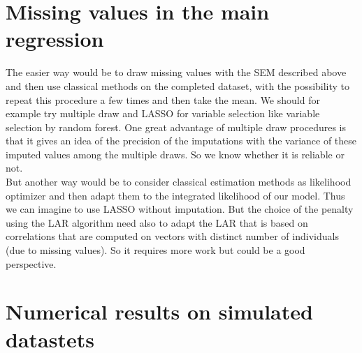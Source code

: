 \documentclass[12pt,a4paper]{report}
\begin{document}
%			
%			
			
	\section{Missing values in the main regression}
		The easier way would be to draw missing values with the SEM described above and then use classical methods on the completed dataset, with the possibility to repeat this procedure a few times and then take the mean. We should for example try multiple draw and LASSO for variable selection like variable selection by random forest. One great advantage of multiple draw procedures is that it gives an idea of the precision of the imputations with the variance of these imputed values among the multiple draws. So we know whether it is reliable or not. \\
		
		But another way would be to consider classical estimation methods as likelihood optimizer and then adapt them to the integrated likelihood of our model. Thus we can imagine to use LASSO without imputation. But the choice of the penalty using the LAR algorithm need also to adapt the LAR that is based on correlations that are computed on vectors with distinct number of individuals (due to missing values). So it requires more work but could be a good perspective.
	\section{Numerical results on simulated datastets}
\end{document}
